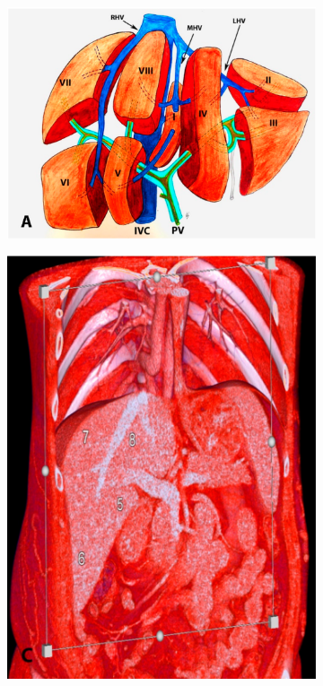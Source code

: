 \documentclass[11pt]{article} %
\begin{document}
\begin{multicols}{2}
\begin{figure}[H]
	\centering
	\begin{subfigure}[t]{0.25\textwidth}
		\centering
		\includegraphics[width=\textwidth]{assets/figure_a.png} %
		\caption{}
		\label{fig:figure-a}
	\end{subfigure}
	\hfill
	\begin{subfigure}[t]{0.25\textwidth}
		\centering
		\includegraphics[width=\textwidth]{assets/figure_c.png} %

\end{subfigure}
\end{figure}
\end{multicols}
\end{document}
